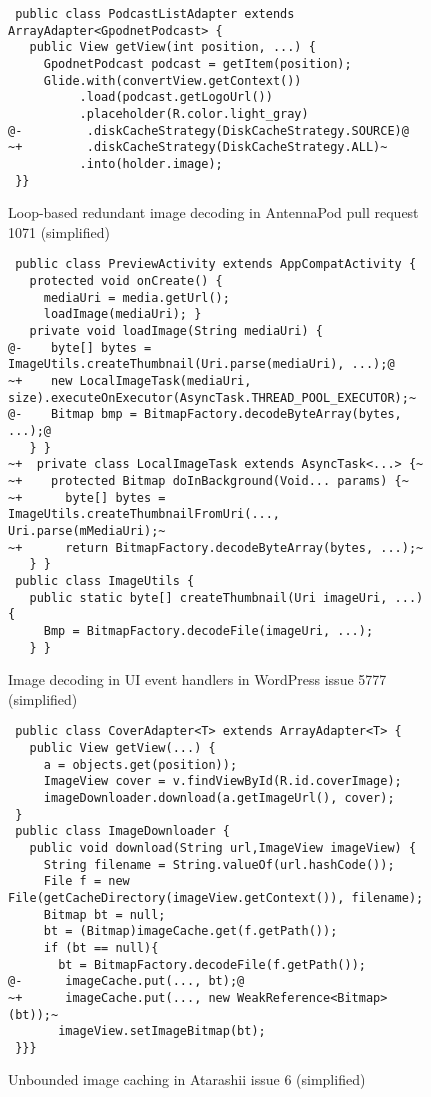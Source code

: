 \begin{figure}
  \centering
  \begin{lstlisting}
 public class PodcastListAdapter extends ArrayAdapter<GpodnetPodcast> { 
   public View getView(int position, ...) {
     GpodnetPodcast podcast = getItem(position);
     Glide.with(convertView.getContext())
          .load(podcast.getLogoUrl())
          .placeholder(R.color.light_gray)
@-         .diskCacheStrategy(DiskCacheStrategy.SOURCE)@
~+         .diskCacheStrategy(DiskCacheStrategy.ALL)~
          .into(holder.image);
 }}
\end{lstlisting}
  \caption{Loop-based redundant image decoding in AntennaPod pull request 1071 (simplified)}
  \label{pattern2}
\end{figure}

\begin{figure}
	\centering
	\begin{lstlisting}
 public class PreviewActivity extends AppCompatActivity {
   protected void onCreate() {
     mediaUri = media.getUrl();
     loadImage(mediaUri); }
   private void loadImage(String mediaUri) {
@-    byte[] bytes = ImageUtils.createThumbnail(Uri.parse(mediaUri), ...);@
~+    new LocalImageTask(mediaUri, size).executeOnExecutor(AsyncTask.THREAD_POOL_EXECUTOR);~
@-    Bitmap bmp = BitmapFactory.decodeByteArray(bytes, ...);@
   } }
~+  private class LocalImageTask extends AsyncTask<...> {~
~+    protected Bitmap doInBackground(Void... params) {~
~+      byte[] bytes = ImageUtils.createThumbnailFromUri(..., Uri.parse(mMediaUri);~
~+      return BitmapFactory.decodeByteArray(bytes, ...);~
   } }
 public class ImageUtils {
   public static byte[] createThumbnail(Uri imageUri, ...) {
     Bmp = BitmapFactory.decodeFile(imageUri, ...);
   } }
\end{lstlisting}
	\caption{Image decoding in UI event handlers in WordPress issue 5777 (simplified)}
	\label{pattern3}
\end{figure}

\begin{figure}
	\centering
	\begin{lstlisting}
 public class CoverAdapter<T> extends ArrayAdapter<T> {
   public View getView(...) {
     a = objects.get(position));
     ImageView cover = v.findViewById(R.id.coverImage);
     imageDownloader.download(a.getImageUrl(), cover);
 }
 public class ImageDownloader {
   public void download(String url,ImageView imageView) {
     String filename = String.valueOf(url.hashCode());
     File f = new File(getCacheDirectory(imageView.getContext()), filename);
     Bitmap bt = null;    	 
     bt = (Bitmap)imageCache.get(f.getPath());
     if (bt == null){
       bt = BitmapFactory.decodeFile(f.getPath());
@-      imageCache.put(..., bt);@
~+      imageCache.put(..., new WeakReference<Bitmap>(bt));~
       imageView.setImageBitmap(bt);
 }}}
\end{lstlisting}
	\caption{Unbounded image caching in Atarashii issue 6 (simplified)}
	\label{pattern4}
\end{figure}

